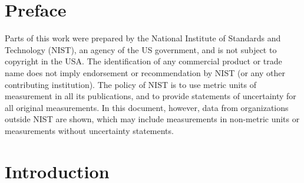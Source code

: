 \documentclass{book}
\begin{document}
\newpage

\frontmatter


\chapter{Preface}

Parts of this work were prepared by the National Institute of Standards and Technology (NIST), an agency of the US government, and is not subject to copyright in the USA. The identification of any commercial product or trade name does not imply endorsement or recommendation by NIST (or any other contributing institution). The policy of NIST is to use metric units of measurement in all its publications, and to provide statements of uncertainty for all original measurements. In this document, however, data from organizations outside NIST are shown, which may include measurements in non-metric units or measurements without uncertainty statements.

\newpage

\tableofcontents

\mainmatter

\pagestyle{plain}

\chapter{Introduction}
\end{document}
